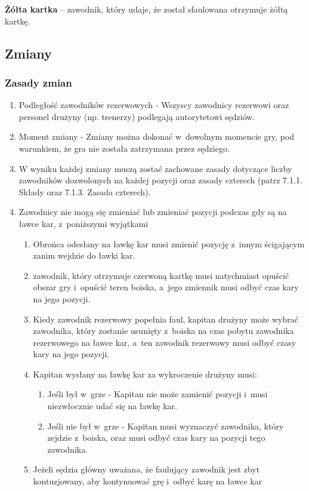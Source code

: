 \documentclass[12pt]{article}
\newcommand\yellowcard[1]{\bgroup\textcolor{darkyellow}{\textbf{#1}}}
\begin{document}
\yellowcard{Żółta kartka} -- zawodnik, który udaje, że został sfaulowana
otrzymuje żółtą kartkę.

\subsection{Zmiany}

\subsubsection{Zasady zmian}

\begin{enumerate}
	\item
	      Podległość zawodników rezerwowych - Wszyscy zawodnicy
	      rezerwowi oraz personel drużyny (np. trenerzy) podlegają autorytetowi
	      sędziów.
	\item
	      Moment zmiany - Zmiany można dokonać w~dowolnym momencie gry,
	      pod warunkiem, że gra nie została zatrzymana przez sędziego.
	\item
	      W wyniku każdej zmiany muszą zostać zachowane zasady dotyczące liczby
	      zawodników dozwolonych na każdej pozycji oraz zasady czterech (patrz
	      7.1.1. Składy oraz 7.1.3. Zasada czterech).
	\item
	      Zawodnicy nie mogą się zmieniać lub zmieniać pozycji podczas gdy są na
	      ławce kar, z~poniższymi wyjątkami

	      \begin{enumerate}
		      \item
		            Obrońca odesłany na ławkę kar musi zmienić pozycję z~innym
		            ścigającym zanim wejdzie do ławki kar.
		      \item
		            zawodnik, który otrzymuje czerwoną kartkę musi natychmiast opuścić
		            obszar gry i~opuścić teren boiska, a~jego zmiennik musi odbyć czas
		            kary na jego pozycji.
		      \item
		            Kiedy zawodnik rezerwowy popełnia faul, kapitan drużyny może wybrać
		            zawodnika, który zostanie usunięty z~boiska na czas pobytu zawodnika
		            rezerwowego na ławce kar, a~ten zawodnik rezerwowy musi odbyć czasy
		            kary na jego pozycji.
		      \item
		            Kapitan wysłany na ławkę kar za wykroczenie drużyny musi:

		            \begin{enumerate}
			            \item
			                  Jeśli był w~grze - Kapitan nie może zamienić pozycji i~musi
			                  niezwłocznie udać się na ławkę kar.
			            \item
			                  Jeśli nie był w~grze - Kapitan musi wyznaczyć zawodnika, który
			                  zejdzie z~boiska, oraz musi odbyć czas kary na pozycji tego
			                  zawodnika.
		            \end{enumerate}
		      \item
		            Jeżeli sędzia główny uważana, że faulujący zawodnik jest zbyt
		            kontuzjowany, aby kontynuować grę i~odbyć karę na ławce kar


\end{enumerate}
\end{enumerate}
\end{document}

